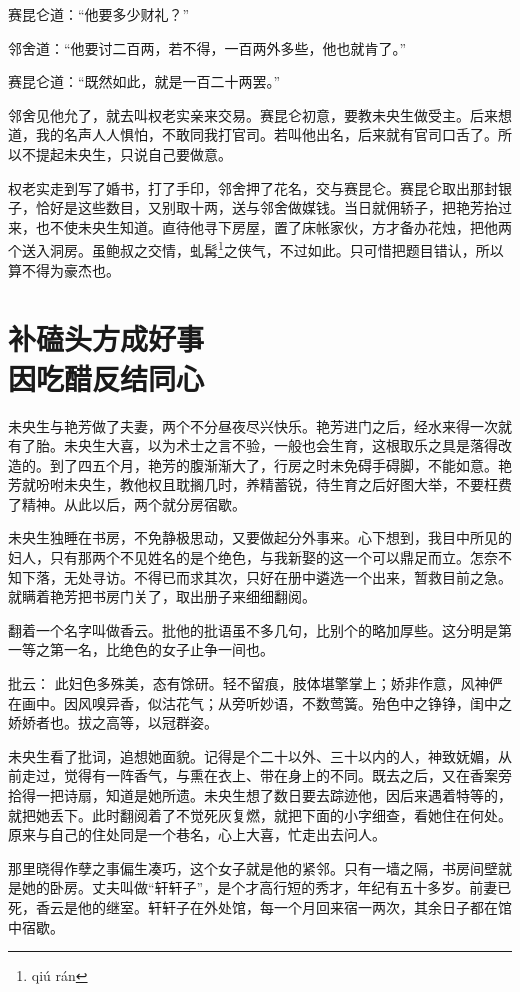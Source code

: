 \documentclass[a4paper,12pt,UTF8,twoside]{ctexbook}
\begin{document}
赛昆仑道：“他要多少财礼？”

邻舍道：“他要讨二百两，若不得，一百两外多些，他也就肯了。”

赛昆仑道：“既然如此，就是一百二十两罢。”

邻舍见他允了，就去叫权老实亲来交易。赛昆仑初意，要教未央生做受主。后来想道，我的名声人人惧怕，不敢同我打官司。若叫他出名，后来就有官司口舌了。所以不提起未央生，只说自己要做意。

权老实走到写了婚书，打了手印，邻舍押了花名，交与赛昆仑。赛昆仑取出那封银子，恰好是这些数目，又别取十两，送与邻舍做媒钱。当日就佣轿子，把艳芳抬过来，也不使未央生知道。直待他寻下房屋，置了床帐家伙，方才备办花烛，把他两个送入洞房。虽鲍叔之交情，虬髯\footnote{qi\'u r\'an}之侠气，不过如此。只可惜把题目错认，所以算不得为豪杰也。

\chapter[补磕头方成好事\ 因吃醋反结同心]{补磕头方成好事\\因吃醋反结同心}

未央生与艳芳做了夫妻，两个不分昼夜尽兴快乐。艳芳进门之后，经水来得一次就有了胎。未央生大喜，以为术士之言不验，一般也会生育，这根取乐之具是落得改造的。到了四五个月，艳芳的腹渐渐大了，行房之时未免碍手碍脚，不能如意。艳芳就吩咐未央生，教他权且耽搁几时，养精蓄锐，待生育之后好图大举，不要枉费了精神。从此以后，两个就分房宿歇。

未央生独睡在书房，不免静极思动，又要做起分外事来。心下想到，我目中所见的妇人，只有那两个不见姓名的是个绝色，与我新娶的这一个可以鼎足而立。怎奈不知下落，无处寻访。不得已而求其次，只好在册中遴选一个出来，暂救目前之急。就瞒着艳芳把书房门关了，取出册子来细细翻阅。

翻着一个名字叫做香云。批他的批语虽不多几句，比别个的略加厚些。这分明是第一等之第一名，比绝色的女子止争一间也。

批云：
此妇色多殊美，态有馀研。轻不留痕，肢体堪擎掌上；娇非作意，风神俨在画中。因风嗅异香，似沽花气；从旁听妙语，不数莺簧。殆色中之铮铮，闺中之娇娇者也。拔之高等，以冠群姿。

未央生看了批词，追想她面貌。记得是个二十以外、三十以内的人，神致妩媚，从前走过，觉得有一阵香气，与熏在衣上、带在身上的不同。既去之后，又在香案旁拾得一把诗扇，知道是她所遗。未央生想了数日要去踪迹他，因后来遇着特等的，就把她丢下。此时翻阅着了不觉死灰复燃，就把下面的小字细查，看她住在何处。原来与自己的住处同是一个巷名，心上大喜，忙走出去问人。

那里晓得作孽之事偏生凑巧，这个女子就是他的紧邻。只有一墙之隔，书房间壁就是她的卧房。丈夫叫做“轩轩子”，是个才高行短的秀才，年纪有五十多岁。前妻已死，香云是他的继室。轩轩子在外处馆，每一个月回来宿一两次，其余日子都在馆中宿歇。
\end{document}
